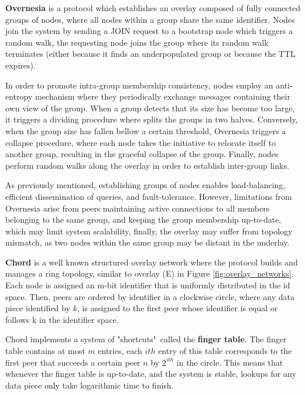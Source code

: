 \textbf{Overnesia} \cite{leitao2014overnesia} is a protocol which establishes an overlay composed of fully connected groups of nodes, where all nodes within a group share the same identifier. Nodes join the system by sending a JOIN request to a bootstrap node which triggers a random walk, the requesting node joins the group where its random walk terminates (either because it finds an underpopulated group or because the TTL expires). 

In order to promote intra-group membership consistency, nodes employ an anti-entropy mechanism where they periodically exchange messages containing their own view of the group. When a group detects that its size has become too large, it triggers a dividing procedure where splits the groups in two halves. Conversely, when the group size has fallen bellow a certain threshold, Overnesia triggers a collapse procedure, where each node takes the initiative to relocate itself to another group, resulting in the graceful collapse of the group. Finally, nodes perform random walks along the overlay in order to establish inter-group links.

As previously mentioned, establishing groups of nodes enables load-balancing, efficient dissemination of queries, and fault-tolerance. However, limitations from Overnesia arise from peers maintaining active connections to all members belonging to the same group, and keeping the group membership up-to-date, which may limit system scalability, finally, the overlay may suffer from topology mismatch, as two nodes within the same group may be distant in the underlay.

\textbf{Chord} \cite{stoica2003chord} is a well known structured overlay network where the protocol builds and manages a ring topology, similar to overlay (E) in Figure \ref{fig:overlay_networks}. Each node is assigned an m-bit identifier that is uniformly distributed in the id space. Then, peers are ordered by identifier in a clockwise circle, where any data piece identified by \(k\), is assigned to the first peer whose identifier is equal or follows k in the identifier space. 

Chord implements a system of "shortcuts"\ called the \textbf{finger table}. The finger table contains at most \(m\) entries, each $ith$ entry of this table corresponds to the first peer that succeeds a certain peer \(n\) by \(2^{ith}\) in the circle. This means that whenever the finger table is up-to-date, and the system is stable, lookups for any data piece only take logarithmic time to finish. 

